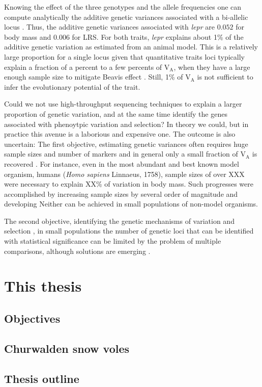 Knowing the effect of the three genotypes and the allele frequencies one can compute analytically the additive genetic variances associated with a bi-allelic locus \parencite[][p77]{Fisher1941average,Lynch1998}. Thus, the additive genetic variances associated with \emph{lepr} are $0.052$  for body mass and $0.006$ for LRS. For both traits, \emph{lepr} explains about 1\% of the additive genetic variation as estimated from an animal model. This is a relatively large proportion for a single locus given that quantitative traits loci typically explain a fraction of a percent to a few percents of V$_\text{A}$, when they have a large enough sample size to mitigate Beavis effect \parencite{Flint2009,Jensen2014}.  Still, 1\% of V$_\text{A}$ is not sufficient to infer the evolutionary potential of the trait.

Could we not use high-throughput sequencing techniques to explain a larger proportion of genetic variation, and at the same time identify the genes associated with phenoytpic variation and selection? 
In theory we could, but in practice this avenue is a laborious and expensive one. The outcome is also uncertain: 
The first objective, estimating genetic variances often requires huge sample sizes and number of markers and in general only a small fraction of V$_\text{A}$ is recovered \parencite{Bloom2013}. For instance, even in the most abundant and best known model organism, humans (\textit{Homo sapiens} Linnaeus, 1758), 
sample sizes of over XXX were necessary to explain 
XX\% of variation in body mass. 
Such progresses were accomplished by increasing sample sizes by several order of magnitude and developing 
Neither can be achieved in small populations of non-model organisms.

The second objective, identifying the genetic mechanisms of variation and selection , in small populations the number of genetic loci that can be identified with statistical significance can be limited by the problem of multiple comparisons, although solutions are emerging . 



\section{This thesis}

\subsection{Objectives}

\subsection{Churwalden snow voles}

\subsection{Thesis outline}

\printbibliography[heading=subbibliography]


